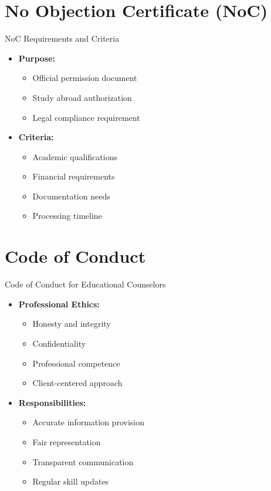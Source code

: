 \documentclass{beamer}
\begin{document}
\section{No Objection Certificate (NoC)}
\begin{frame}{NoC Requirements and Criteria}
\begin{itemize}
    \item \textbf{Purpose:}
    \begin{itemize}
        \item Official permission document
        \item Study abroad authorization
        \item Legal compliance requirement
    \end{itemize}
    \item \textbf{Criteria:}
    \begin{itemize}
        \item Academic qualifications
        \item Financial requirements
        \item Documentation needs
        \item Processing timeline
    \end{itemize}
\end{itemize}
\end{frame}

\section{Code of Conduct}
\begin{frame}{Code of Conduct for Educational Counselors}
\begin{itemize}
    \item \textbf{Professional Ethics:}
    \begin{itemize}
        \item Honesty and integrity
        \item Confidentiality
        \item Professional competence
        \item Client-centered approach
    \end{itemize}
    \item \textbf{Responsibilities:}
    \begin{itemize}
        \item Accurate information provision
        \item Fair representation
        \item Transparent communication
        \item Regular skill updates
    \end{itemize}
\end{itemize}
\end{frame}
\end{document}
